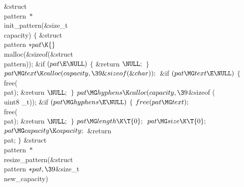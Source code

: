 \Y\B\1\1\&{struct} \\{pattern} ${}{*}{}$\\{init\_pattern}(\&{size\_t} %
\\{capacity})\2\2\6
${}\{{}$\1\6
\&{struct} \\{pattern} ${}{*}\\{pat}\K{}$\\{malloc}(\&{sizeof}(\&{struct} %
\\{pattern}));\7
\&{if} ${}(\\{pat}\E\NULL){}$\5
${}\{{}$\1\6
\&{return} ${}\NULL;{}$\6
\4${}\}{}$\2\6
${}\\{pat}\MG\\{text}\K\\{calloc}(\\{capacity},\39\&{sizeof}(\&{char}));{}$\6
\&{if} ${}(\\{pat}\MG\\{text}\E\NULL){}$\5
${}\{{}$\1\6
\\{free}(\\{pat});\6
\&{return} ${}\NULL;{}$\6
\4${}\}{}$\2\6
${}\\{pat}\MG\\{hyphens}\K\\{calloc}(\\{capacity},\39{}$\&{sizeof} (\\{uint8%
\_t}));\6
\&{if} ${}(\\{pat}\MG\\{hyphens}\E\NULL){}$\5
${}\{{}$\1\6
${}\\{free}(\\{pat}\MG\\{text});{}$\6
\\{free}(\\{pat});\6
\&{return} ${}\NULL;{}$\6
\4${}\}{}$\2\6
${}\\{pat}\MG\\{length}\K\T{0};{}$\6
${}\\{pat}\MG\\{size}\K\T{0};{}$\6
${}\\{pat}\MG\\{capacity}\K\\{capacity};{}$\6
\&{return} \\{pat};\6
\4${}\}{}$\2\7
\1\1\&{struct} \\{pattern} ${}{*}{}$\\{resize\_pattern}(\&{struct} \\{pattern}
${}{*}\\{pat},\39{}$\&{size\_t} \\{new\_capacity})\2\2\6
